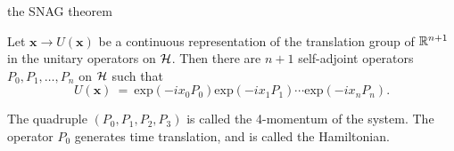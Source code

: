 \documentclass[8pt]{beamer}
\begin{document}
\begin{frame}{the SNAG theorem}

  Let $\mathbf{x}\to U(\mathbf{x})$ be a continuous representation of
  the translation group of $\mathbb R ^{n+1}$ in the unitary operators on
  $\mathcal H$.  Then there are $n+1$ self-adjoint operators $P_0,P_1,\dots
  ,P_{n}$ on $\mathcal H$ such that
$$ U(\mathbf{x}) \: = \: \mathrm{exp}(-ix_0P_0)\mathrm{exp}(-ix_1P_1)\cdots \mathrm{exp}(-ix_{n}P_{n}) .$$

\bigskip The quadruple $(P_0,P_1,P_2,P_3)$ is called the 4-momentum of
the system.  The operator $P_0$ generates time translation, and is
called the Hamiltonian.

\end{frame}
\end{document}
